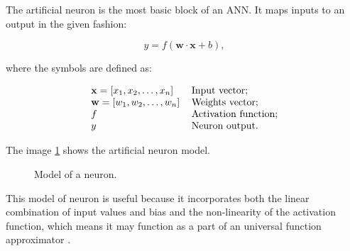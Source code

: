 The artificial neuron is the most basic block of an ANN. It maps inputs to an output in the given fashion:

\begin{equation} \label{eq:neuron_eq}
	y = f(\mathbf{w} \cdot \mathbf{x} + b),
\end{equation}

where the symbols are defined as:

\begin{equation} \label{eq:neuron_symbols}
	\begin{tabular}{ll}
		$\mathbf{x} = [x_1, x_2, \ldots, x_n]$ & Input vector;\\
		$\mathbf{w} = [w_1, w_2, \ldots, w_n]$ & Weights vector;\\
		$f$ & Activation function; \\
		$y$ & Neuron output.
	\end{tabular}
\end{equation}

The image \ref{fig:neuron} shows the artificial neuron model.

\begin{figure}[ht]
	\centering
	\caption{Model of a neuron.} \label{fig:neuron}
\end{figure}

This model of neuron is useful because it incorporates both the linear combination of input values and bias and the non-linearity of the activation function, which means it may function as a part of an universal function approximator \cite{HORNIK1989}.

